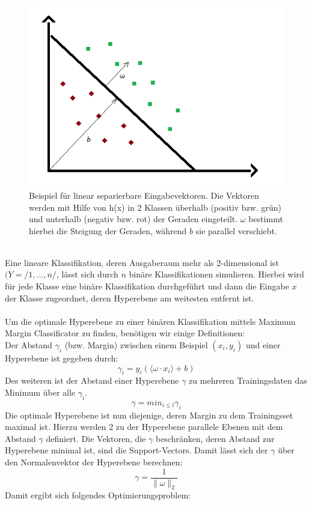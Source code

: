 \begin{figure}[hbtp]
\includegraphics[width=0.7\linewidth]{LinSeparabel.png}
\centering
\caption{Beispiel für linear separierbare Eingabevektoren. Die Vektoren werden mit Hilfe von h(x) in 2 Klassen überhalb (positiv bzw. grün) und unterhalb (negativ bzw. rot) der Geraden eingeteilt. $\omega$ bestimmt hierbei die Steigung der Geraden, während $b$ sie parallel verschiebt.}
\label{fig:LinSeparabel}
\end{figure}\ \\
Eine lineare Klassifikation, deren Ausgaberaum mehr als 2-dimensional ist $(Y = /{1,...,n/}$, lässt sich durch $n$ binäre Klassifikationen simulieren. Hierbei wird für jede Klasse eine binäre Klassifikation durchgeführt und dann die Eingabe $x$ der Klasse zugeordnet, deren Hyperebene am weitesten entfernt ist.\\ \\
Um die optimale Hyperebene zu einer binären Klassifikation mittels \glqq{}Maximum Margin Classificator\grqq{} zu finden, benötigen wir einige Definitionen: \\
 Der Abstand $\gamma_{i}$ (bzw. Margin) zwischen einem Beispiel $(x_{i},y_{i})$ und einer Hyperebene ist gegeben durch:
\[ \gamma_{i} = y_{i}(\langle \omega \cdot x_{i} \rangle + b )\]
Des weiteren ist der Abstand einer Hyperebene $\gamma$ zu mehreren Trainingsdaten das Minimum über alle $\gamma_{i}$.
\[\gamma = min_{i\leq l} \gamma_{i}\]
Die optimale Hyperebene ist nun diejenige, deren Margin zu dem Trainingsset maximal ist. Hierzu werden 2 zu der Hyperebene parallele Ebenen mit dem Abstand $\gamma$ definiert. Die Vektoren, die $\gamma$ beschränken, deren Abstand zur Hyperebene minimal ist, sind die \glqq{}Support-Vectors\grqq{}. Damit lässt sich der $\gamma$ über den Normalenvektor der Hyperebene berechnen:
\[\gamma = \frac{1}{\lVert \omega \rVert_{2}} \]
Damit ergibt sich folgendes Optimierungsproblem:\\

